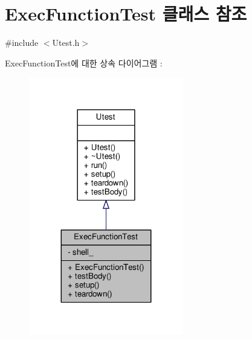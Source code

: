\hypertarget{class_exec_function_test}{}\section{Exec\+Function\+Test 클래스 참조}
\label{class_exec_function_test}


{\ttfamily \#include $<$Utest.\+h$>$}



Exec\+Function\+Test에 대한 상속 다이어그램 \+: 
\nopagebreak
\begin{figure}[H]
\begin{center}
\leavevmode
\includegraphics[width=191pt]{class_exec_function_test__inherit__graph}
\end{center}
\end{figure}



